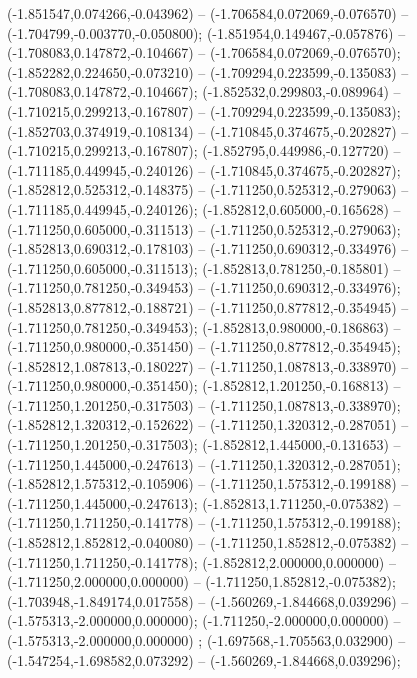  (-1.851547,0.074266,-0.043962) -- (-1.706584,0.072069,-0.076570) -- (-1.704799,-0.003770,-0.050800);
 (-1.851954,0.149467,-0.057876) -- (-1.708083,0.147872,-0.104667) -- (-1.706584,0.072069,-0.076570);
 (-1.852282,0.224650,-0.073210) -- (-1.709294,0.223599,-0.135083) -- (-1.708083,0.147872,-0.104667);
 (-1.852532,0.299803,-0.089964) -- (-1.710215,0.299213,-0.167807) -- (-1.709294,0.223599,-0.135083);
 (-1.852703,0.374919,-0.108134) -- (-1.710845,0.374675,-0.202827) -- (-1.710215,0.299213,-0.167807);
 (-1.852795,0.449986,-0.127720) -- (-1.711185,0.449945,-0.240126) -- (-1.710845,0.374675,-0.202827);
 (-1.852812,0.525312,-0.148375) -- (-1.711250,0.525312,-0.279063) -- (-1.711185,0.449945,-0.240126);
 (-1.852812,0.605000,-0.165628) -- (-1.711250,0.605000,-0.311513) -- (-1.711250,0.525312,-0.279063);
 (-1.852813,0.690312,-0.178103) -- (-1.711250,0.690312,-0.334976) -- (-1.711250,0.605000,-0.311513);
 (-1.852813,0.781250,-0.185801) -- (-1.711250,0.781250,-0.349453) -- (-1.711250,0.690312,-0.334976);
 (-1.852813,0.877812,-0.188721) -- (-1.711250,0.877812,-0.354945) -- (-1.711250,0.781250,-0.349453);
 (-1.852813,0.980000,-0.186863) -- (-1.711250,0.980000,-0.351450) -- (-1.711250,0.877812,-0.354945);
 (-1.852812,1.087813,-0.180227) -- (-1.711250,1.087813,-0.338970) -- (-1.711250,0.980000,-0.351450);
 (-1.852812,1.201250,-0.168813) -- (-1.711250,1.201250,-0.317503) -- (-1.711250,1.087813,-0.338970);
 (-1.852812,1.320312,-0.152622) -- (-1.711250,1.320312,-0.287051) -- (-1.711250,1.201250,-0.317503);
 (-1.852812,1.445000,-0.131653) -- (-1.711250,1.445000,-0.247613) -- (-1.711250,1.320312,-0.287051);
 (-1.852812,1.575312,-0.105906) -- (-1.711250,1.575312,-0.199188) -- (-1.711250,1.445000,-0.247613);
 (-1.852813,1.711250,-0.075382) -- (-1.711250,1.711250,-0.141778) -- (-1.711250,1.575312,-0.199188);
 (-1.852812,1.852812,-0.040080) -- (-1.711250,1.852812,-0.075382) -- (-1.711250,1.711250,-0.141778);
 (-1.852812,2.000000,0.000000) -- (-1.711250,2.000000,0.000000) -- (-1.711250,1.852812,-0.075382);
 (-1.703948,-1.849174,0.017558) -- (-1.560269,-1.844668,0.039296) -- (-1.575313,-2.000000,0.000000);
 (-1.711250,-2.000000,0.000000) -- (-1.575313,-2.000000,0.000000) ;
 (-1.697568,-1.705563,0.032900) -- (-1.547254,-1.698582,0.073292) -- (-1.560269,-1.844668,0.039296);
